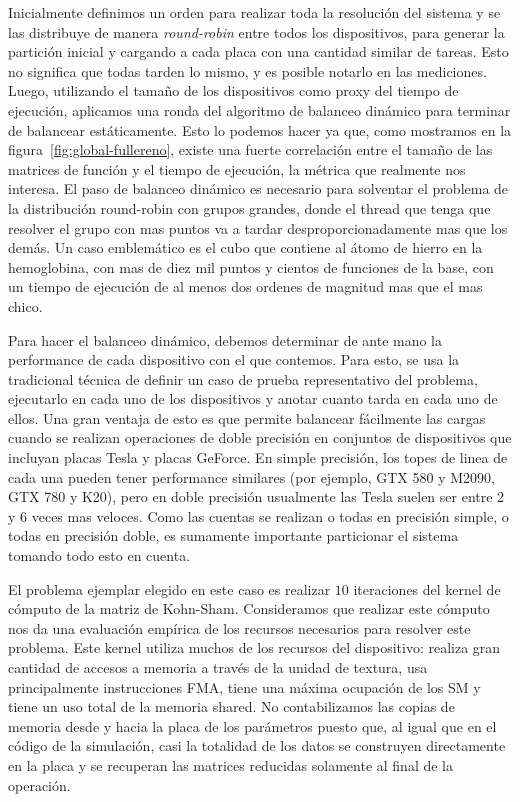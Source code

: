 Inicialmente definimos un orden para realizar toda la resoluci\'on del sistema y
se las distribuye de manera \textit{round-robin} entre todos los dispositivos, para generar la
partici\'on inicial y cargando a cada placa con una cantidad similar de tareas. Esto no significa
que todas tarden lo mismo, y es posible notarlo en las mediciones. Luego, utilizando el tama\~no
de los dispositivos como proxy del tiempo de ejecuci\'on, aplicamos una ronda del algoritmo de balanceo din\'amico
para terminar de balancear est\'aticamente. Esto lo podemos hacer ya que, como mostramos en la figura~\ref{fig:global-fullereno},
existe una fuerte correlaci\'on entre el tama\~no de las matrices de funci\'on y el tiempo de ejecuci\'on, la m\'etrica que realmente
nos interesa. El paso de balanceo din\'amico es necesario para solventar el problema de la distribuci\'on
round-robin con grupos grandes, donde el thread que tenga que resolver el grupo con mas puntos va a tardar
desproporcionadamente mas que los dem\'as. Un caso emblem\'atico es el cubo que contiene al \'atomo de hierro en la hemoglobina,
con mas de diez mil puntos y cientos de funciones de la base, con un tiempo de ejecuci\'on de al menos
dos ordenes de magnitud mas que el mas chico.

Para hacer el balanceo din\'amico, debemos determinar de ante mano la performance de cada
dispositivo con el que contemos. Para esto, se usa la tradicional t\'ecnica de definir un
caso de prueba representativo del problema, ejecutarlo en cada uno de los dispositivos y anotar
cuanto tarda en cada uno de ellos. Una gran ventaja de esto es que permite balancear f\'acilmente las
cargas cuando se realizan operaciones de doble precisi\'on en conjuntos de dispositivos que incluyan
placas Tesla y placas GeForce. En simple precisi\'on, los topes de linea de cada una pueden tener
performance similares (por ejemplo, GTX 580 y M2090, GTX 780 y K20), pero en doble precisi\'on
usualmente las Tesla suelen ser entre 2 y 6 veces mas veloces. Como las cuentas se realizan
o todas en precisi\'on simple, o todas en precisi\'on doble, es sumamente importante particionar el
sistema tomando todo esto en cuenta.

El problema ejemplar elegido en este caso es realizar $10$ iteraciones del kernel de c\'omputo de la matriz de Kohn-Sham.
Consideramos que realizar este c\'omputo nos da una evaluaci\'on
emp\'irica de los recursos necesarios para resolver este problema. Este kernel utiliza muchos
de los recursos del dispositivo: realiza gran cantidad de accesos a memoria a trav\'es
de la unidad de textura, usa principalmente instrucciones FMA, tiene una m\'axima ocupaci\'on de los SM
y tiene un uso total de la memoria shared. No contabilizamos las copias de memoria desde y hacia la
placa de los par\'ametros puesto que, al igual que en el c\'odigo de la simulaci\'on, casi la totalidad
de los datos se construyen directamente en la placa y se recuperan las matrices reducidas solamente al final
de la operaci\'on.

